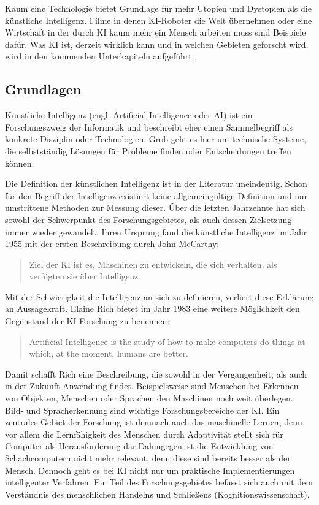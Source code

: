 \documentclass[a4paper,12pt, german]{report}
\begin{document}
Kaum eine Technologie bietet Grundlage für mehr Utopien und Dystopien als die künstliche Intelligenz. Filme in denen KI-Roboter die Welt übernehmen oder eine Wirtschaft in der durch KI kaum mehr ein Mensch arbeiten muss sind Beispiele dafür. Was KI ist, derzeit wirklich kann und in welchen Gebieten geforscht wird, wird in den kommenden Unterkapiteln aufgeführt. 

\subsection{Grundlagen}

Künstliche Intelligenz (engl. Artificial Intelligence oder AI) ist ein Forschungszweig der Informatik und beschreibt eher einen Sammelbegriff als konkrete Disziplin oder Technologien. Grob geht es hier um technische Systeme, die selbstständig Lösungen für Probleme finden oder Entscheidungen treffen können. \cite{01} \cite{10}

Die Definition der künstlichen Intelligenz ist in der Literatur uneindeutig. Schon für den Begriff der Intelligenz existiert keine allgemeingültige Definition und nur umstrittene Methoden zur Messung dieser. Über die letzten Jahrzehnte hat sich sowohl der Schwerpunkt des Forschungsgebietes, als auch dessen Zielsetzung immer wieder gewandelt. Ihren Ursprung fand die künstliche Intelligenz im Jahr 1955 mit der ersten Beschreibung durch John McCarthy:
\begin{quote}
  Ziel der KI ist es, Maschinen zu entwickeln, die sich verhalten, als verfügten sie über Intelligenz.
\end{quote}
 Mit der Schwierigkeit die Intelligenz an sich zu definieren, verliert diese Erklärung an Aussagekraft. Elaine Rich bietet im Jahr 1983 eine weitere Möglichkeit den Gegenstand der KI-Forschung zu benennen: 

 \begin{quote}
  Artificial Intelligence is the study of how to make computers do things at which, at the moment, humans are better.
 \end{quote} 

 Damit schafft Rich eine Beschreibung, die sowohl in der Vergangenheit, als auch in der Zukunft Anwendung findet. Beispielsweise sind Menschen bei Erkennen von Objekten, Menschen oder Sprachen den Maschinen noch weit überlegen. Bild- und Spracherkennung sind wichtige Forschungsbereiche der KI. Ein zentrales Gebiet der Forschung ist demnach auch das maschinelle Lernen, denn vor allem die Lernfähigkeit des Menschen durch Adaptivität stellt sich für Computer als Herausforderung dar.Dahingegen ist die Entwicklung von Schachcomputern nicht mehr relevant, denn diese sind bereits besser als der Mensch. Dennoch geht es bei KI nicht nur um praktische Implementierungen intelligenter Verfahren. Ein Teil des Forschungsgebietes befasst sich auch mit dem Verständnis des menschlichen Handelns und Schließens (Kognitionswissenschaft).
 \cite{11}
\end{document}
